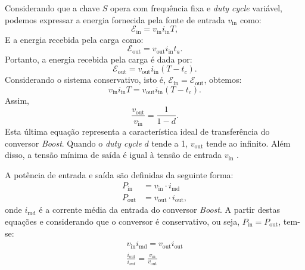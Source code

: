Considerando que a chave $S$ opera com frequência fixa e \textit{duty cycle }variável, podemos expressar a energia fornecida pela fonte de entrada $v_{\mathrm{in}}$ como: \begin{equation} \mathcal{E}_{\mathrm{in}} = v_{\mathrm{in}} i_{\mathrm{in}} T, \end{equation} E a energia recebida pela carga como: \begin{equation} \mathcal{E}_{\mathrm{out}} = v_{\mathrm{out}} i_{\mathrm{in}} t_a. \end{equation} Portanto, a energia recebida pela carga é dada por: \begin{equation} \mathcal{E}_{\mathrm{out}} = v_{\mathrm{out}} i_{\mathrm{in}} (T - t_c). \end{equation} Considerando o sistema conservativo, isto é, $\mathcal{E}_{\mathrm{in}} = \mathcal{E}_{\mathrm{out}}$, obtemos: \begin{equation} v_{\mathrm{in}} i_{\mathrm{in}} T = v_{\mathrm{out}} i_{\mathrm{in}} (T - t_c). \end{equation} Assim, \begin{equation} \frac{v_{\mathrm{out}}}{v_{\mathrm{in}}} = \frac{1}{1-d} \label{eq:ideal_feature_boost}.\end{equation} Esta última equação representa a característica ideal de transferência do conversor \textit{Boost}. Quando o \textit{duty cycle }$d$ tende a 1, $v_{\mathrm{out}}$ tende ao infinito. Além disso, a tensão mínima de saída é igual à tensão de entrada $v_{\mathrm{in}}$ \citep{martins2008}.

A potência de entrada e saída são definidas da seguinte forma: \begin{align} P_{\mathrm{in}} &= v_{\mathrm{in}} \cdot i_{\mathrm{md}} \\ P_{\mathrm{out}} &= v_{\mathrm{out}} \cdot i_{\mathrm{out}}, \end{align} onde $i_{\mathrm{md}}$ é a corrente média da entrada do conversor \textit{Boost}. A partir destas equações e considerando que o conversor é conservativo, ou seja, $P_{\mathrm{in}} = P_{\mathrm{out}}$, tem-se: \begin{gather} v_{\mathrm{in}} i_{\mathrm{md}} = v_{\mathrm{out}}i_{\mathrm{out}} \\ \frac{i_{\mathrm{out}}}{i_{md}} = \frac{v_{\mathrm{in}}}{v_{\mathrm{out}}} \label{eq:boost_converter_iv} \end{gather}

